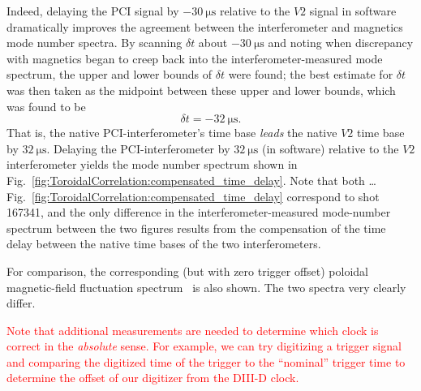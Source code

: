 Indeed, delaying the PCI signal by $-\SI{30}{\micro\second}$
relative to the $V2$ signal in software dramatically improves
the agreement between the interferometer and magnetics mode number spectra.
By scanning $\delta t$ about $-\SI{30}{\micro\second}$ and
noting when discrepancy with magnetics began to creep back into
the interferometer-measured mode spectrum,
the upper and lower bounds of $\delta t$ were found;
the best estimate for $\delta t$ was then taken as the midpoint
between these upper and lower bounds, which was found to be
\begin{equation}
  \delta t = -\SI{32}{\micro\second}.
  \label{eq:ToroidalCorrelation:time_delay}
\end{equation}
That is, the native PCI-interferometer's time base \emph{leads}
the native $V2$ time base by $\SI{32}{\micro\second}$.
Delaying the PCI-interferometer by $\SI{32}{\micro\second}$ (in software)
relative to the $V2$ interferometer yields the mode number spectrum
shown in Fig.~\ref{fig:ToroidalCorrelation:compensated_time_delay}.
Note that both \ldots
Fig.~\ref{fig:ToroidalCorrelation:compensated_time_delay}
correspond to shot 167341, and
the only difference in the interferometer-measured mode-number spectrum
between the two figures results from the compensation of the time delay
between the native time bases of the two interferometers.



For comparison, the corresponding (but with zero trigger offset)
poloidal magnetic-field fluctuation spectrum~\cite{strait_rsi06}
is also shown.
The two spectra very clearly differ.

\textcolor{red}{Note that additional measurements are needed
to determine which clock is correct in the \emph{absolute} sense.
For example, we can try digitizing a trigger signal and
comparing the digitized time of the trigger to the ``nominal'' trigger time
to determine the offset of our digitizer from the DIII-D clock.}

